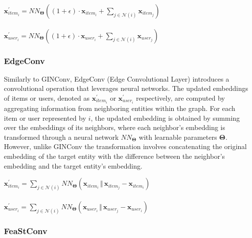 \documentclass[bst/sn-nature]{sn-jnl}
\begin{document}
\begin{multicols}{2}
\begin{center}
    $\mathbf{x}^{\prime}_{item_{i}} = NN_{\mathbf{\Theta}} \left( (1 + \epsilon) \cdot \mathbf{x}_{item_{i}} + \sum_{j \in \mathcal{N}(i)} \mathbf{x}_{item_{j}} \right)$ \\~\\
    $\mathbf{x}^{\prime}_{user_{i}} = NN_{\mathbf{\Theta}} \left( (1 + \epsilon) \cdot \mathbf{x}_{user_{i}} + \sum_{j \in \mathcal{N}(i)} \mathbf{x}_{user_{j}} \right)$
\end{center}

\subsubsection{EdgeConv\cite{edgeconv}} 

\quad Similarly to GINConv, EdgeConv (Edge Convolutional Layer) introduces a convolutional operation that leverages neural networks. The updated embeddings of items or users, denoted as $\mathbf{x}^{\prime}_{item_i}$ or $\mathbf{x}^{\prime}_{user_i}$ respectively, are computed by aggregating information from neighboring entities within the graph. For each item or user represented by $i$, the updated embedding is obtained by summing over the embeddings of its neighbors, where each neighbor's embedding is transformed through a neural network $NN_{\mathbf{\Theta}}$ with learnable parameters $\mathbf{\Theta}$. However, unlike GINConv the transformation involves concatenating the original embedding of the target entity with the difference between the neighbor's embedding and the target entity's embedding. \\ 

\begin{center}
    $\mathbf{x}^{\prime}_{item_{i}} = \sum_{j \in \mathcal{N}(i)} NN_{\mathbf{\Theta}}(\mathbf{x}_{item_{i}} \, \Vert \, \mathbf{x}_{item_{j}} - \mathbf{x}_{item_{i}})$ \\~\\
    $\mathbf{x}^{\prime}_{user_{i}} = \sum_{j \in \mathcal{N}(i)} NN_{\mathbf{\Theta}}(\mathbf{x}_{user_{i}} \, \Vert \, \mathbf{x}_{user_{j}} - \mathbf{x}_{user_{i}})$
\end{center}


\subsubsection{FeaStConv\cite{feastconv}} 


\end{multicols}
\end{document}
